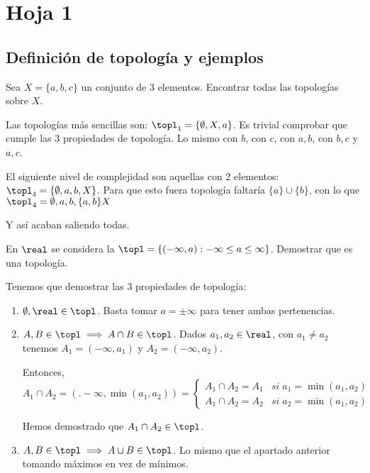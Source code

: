 \section{Hoja 1}

\subsection{Definición de topología y ejemplos}

\begin{problem}[1]
Sea $X=\{a,b,c\}$ un conjunto de 3 elementos. Encontrar todas las topologías sobre $X$.
\solution

Las topologías más sencillas son: $\topl_1 = \{\emptyset,X,a\}$. Es trivial comprobar que cumple las 3 propiedades de topología. Lo mismo con $b$, con $c$, con ${a,b}$, con ${b,c}$ y ${a,c}$.

El siguiente nivel de complejidad son aquellas con 2 elementos: $\topl_4 = \{\emptyset,a,b,X\}$. Para que esto fuera topología faltaría $\{a\} \cup \{b\}$, con lo que $\topl_4 = {\emptyset,a,b,\{a,b\}X}$

Y así acaban saliendo todas.
\end{problem}

\begin{problem}[2]
En $\real$ se considera la $\topl =\{(-\infty,a): -\infty \leq a \leq \infty\}$. Demostrar que es una topología.
\solution

Tenemos que demostrar las 3 propiedades de topología:

\begin{enumerate}
\item $\emptyset,\real \in \topl$. Basta tomar $a=\pm \infty$ para tener ambas pertenencias.
\item $A,B\in\topl \implies A\cap B\in\topl$. Dados $a_1,a_2\in\real$, con $a_1\neq a_2$ tenemos $A_1 = (-\infty,a_1)$ y $A_2 = (-\infty,a_2)$.

Entonces, $A_1\cap A_2 = (.-\infty,\min(a_1,a_2)) = \left\{\begin{array}{cc}
A_1\cap A_2 = A_1 & si\; a_1 = \min(a_1,a_2)\\A_1\cap A_2 = A_2  & si\; a_2 = \min(a_1,a_2)
\end{array}\right.$

Hemos demostrado que $A_1 \cap A_2 \in \topl$.

\item $A,B\in\topl \implies A\cup B\in\topl$. Lo mismo que el apartado anterior tomando máximos en vez de mínimos.
\end{enumerate}
\end{problem}


